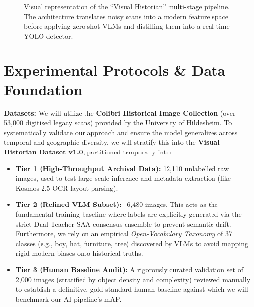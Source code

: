 \documentclass[a4paper, 11pt]{article}
\begin{document}
\begin{figure}[h!]
\caption{Visual representation of the ``Visual Historian'' multi-stage pipeline. The architecture translates noisy scans into a modern feature space before applying zero-shot VLMs and distilling them into a real-time YOLO detector.}
\label{fig:pipeline_flow}
\end{figure}

\section*{Experimental Protocols \& Data Foundation}
\textbf{Datasets:} We will utilize the \textbf{Colibri Historical Image Collection} (over 53,000 digitized legacy scans) provided by the University of Hildesheim. To systematically validate our approach and ensure the model generalizes across temporal and geographic diversity, we will stratify this into the \textbf{Visual Historian Dataset v1.0}, partitioned temporally into:
\begin{itemize}
    \item \textbf{Tier 1 (High-Throughput Archival Data):} 12,110 unlabelled raw images, used to test large-scale inference and metadata extraction (like Kosmos-2.5 OCR layout parsing).
    \item \textbf{Tier 2 (Refined VLM Subset):} ~6,480 images. This acts as the fundamental training baseline where labels are explicitly generated via the strict Dual-Teacher SAA consensus ensemble to prevent semantic drift. Furthermore, we rely on an empirical \textit{Open-Vocabulary Taxonomy} of 37 classes (e.g., boy, hat, furniture, tree) discovered by VLMs to avoid mapping rigid modern biases onto historical truths.
    \item \textbf{Tier 3 (Human Baseline Audit):} A rigorously curated validation set of 2,000 images (stratified by object density and complexity) reviewed manually to establish a definitive, gold-standard human baseline against which we will benchmark our AI pipeline's mAP.
\end{itemize}
\end{document}
